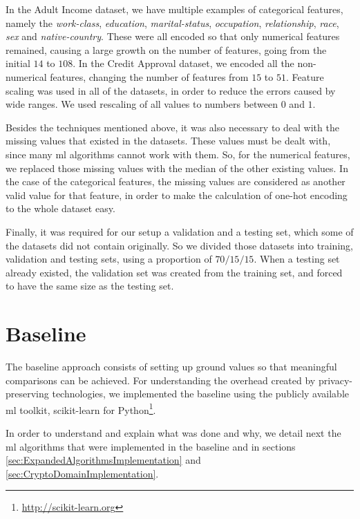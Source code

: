 In the Adult Income dataset, we have multiple examples of categorical features, namely the \textit{work-class}, \textit{education}, \textit{marital-status}, \textit{occupation}, \textit{relationship}, \textit{race}, \textit{sex} and \textit{native-country}. These were all encoded so that only numerical features remained, causing a large growth on the number of features, going from the initial $14$ to $108$.
In the Credit Approval dataset, we encoded all the non-numerical features, changing the number of features from $15$ to $51$.
Feature scaling was used in all of the datasets, in order to reduce the errors caused by wide ranges. We used rescaling of all values to numbers between $0$ and $1$.

Besides the techniques mentioned above, it was also necessary to deal with the missing values that existed in the datasets. These values must be dealt with, since many \ac{ml} algorithms cannot work with them. So, for the numerical features, we replaced those missing values with the median of the other existing values. In the case of the categorical features, the missing values are considered as another valid value for that feature, in order to make the calculation of one-hot encoding to the whole dataset easy. 

Finally, it was required for our setup a validation and a testing set, which some of the datasets did not contain originally. So we divided those datasets into training, validation and testing sets, using a proportion of $70/15/15$. When a testing set already existed, the validation set was created from the training set, and forced to have the same size as the testing set.


\section{Baseline}
\label{sec:BaselineImplementation}

The baseline approach consists of setting up ground values so that meaningful comparisons can be achieved. For understanding the overhead created by privacy-preserving technologies, we implemented the baseline using the publicly available \ac{ml} toolkit, scikit-learn for Python\footnote{\url{http://scikit-learn.org}}.

In order to understand and explain what was done and why, we detail next the \ac{ml} algorithms that were implemented in the baseline and in sections \ref{sec:ExpandedAlgorithmsImplementation} and \ref{sec:CryptoDomainImplementation}.

